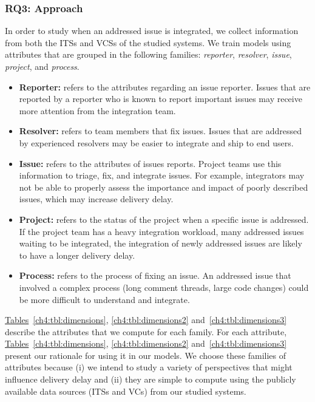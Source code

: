\subsubsection*{RQ3: Approach} 

In order to study when an addressed issue is integrated, we collect information from
both the ITSs and VCSs of the studied systems. We train models using attributes
that are grouped in the following families: \textit{reporter},
\textit{resolver}, \textit{issue}, \textit{project}, and \textit{process}.
\begin{itemize}
	\item \textbf{Reporter:} refers to the attributes regarding an issue reporter.
		Issues that are reported by a reporter who is known to report important
		issues may receive more attention from the integration team.\\

	\item \textbf{Resolver:} refers to team members that fix issues.
		Issues that are addressed by experienced resolvers may be easier
		to integrate and ship to end users.\\

	\item \textbf{Issue:} refers to the attributes of issues reports. Project teams use this
		information to triage, fix, and integrate issues. For
		example, integrators may not be able to properly assess the
		importance and impact of poorly described issues, which may
		increase delivery delay.\\

	\item \textbf{Project:} refers to the status of the project when a
		specific issue is addressed. If the project team has a heavy
		integration workload, \ie many addressed issues waiting to be
		integrated, the integration of newly addressed issues are likely
		to have a longer delivery delay.\\

	\item \textbf{Process:} refers to the process of fixing an issue. An
		addressed issue that involved a complex process (\eg long comment
		threads, large code changes) could be more difficult to
		understand and integrate.\\
\end{itemize}

\hyperref[ch4:tbl:dimensions]{Tables}~\ref{ch4:tbl:dimensions},
\ref{ch4:tbl:dimensions2} and~\ref{ch4:tbl:dimensions3} describe the attributes
that we compute for each family. For each attribute,
\hyperref[ch4:tbl:dimensions]{Tables}~\ref{ch4:tbl:dimensions},
\ref{ch4:tbl:dimensions2} and~\ref{ch4:tbl:dimensions3} present our rationale
for using it in our models. We choose these families of attributes because (i)
we intend to study a variety of perspectives that might influence delivery delay
and (ii) they are simple to compute using the publicly available data sources
(\eg ITSs and VCs) from our studied systems.

